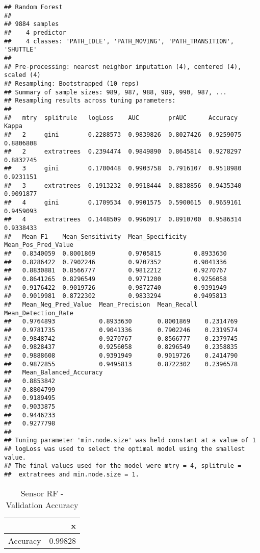 \documentclass[]{article}
\begin{document}
\begin{verbatim}
## Random Forest 
## 
## 9884 samples
##    4 predictor
##    4 classes: 'PATH_IDLE', 'PATH_MOVING', 'PATH_TRANSITION', 'SHUTTLE' 
## 
## Pre-processing: nearest neighbor imputation (4), centered (4), scaled (4) 
## Resampling: Bootstrapped (10 reps) 
## Summary of sample sizes: 989, 987, 988, 989, 990, 987, ... 
## Resampling results across tuning parameters:
## 
##   mtry  splitrule   logLoss    AUC        prAUC      Accuracy   Kappa    
##   2     gini        0.2288573  0.9839826  0.8027426  0.9259075  0.8806808
##   2     extratrees  0.2394474  0.9849890  0.8645814  0.9278297  0.8832745
##   3     gini        0.1700448  0.9903758  0.7916107  0.9518980  0.9231151
##   3     extratrees  0.1913232  0.9918444  0.8838856  0.9435340  0.9091877
##   4     gini        0.1709534  0.9901575  0.5900615  0.9659161  0.9459093
##   4     extratrees  0.1448509  0.9960917  0.8910700  0.9586314  0.9338433
##   Mean_F1    Mean_Sensitivity  Mean_Specificity  Mean_Pos_Pred_Value
##   0.8340059  0.8001869         0.9705815         0.8933630          
##   0.8286422  0.7902246         0.9707352         0.9041336          
##   0.8830881  0.8566777         0.9812212         0.9270767          
##   0.8641265  0.8296549         0.9771200         0.9256058          
##   0.9176422  0.9019726         0.9872740         0.9391949          
##   0.9019981  0.8722302         0.9833294         0.9495813          
##   Mean_Neg_Pred_Value  Mean_Precision  Mean_Recall  Mean_Detection_Rate
##   0.9764893            0.8933630       0.8001869    0.2314769          
##   0.9781735            0.9041336       0.7902246    0.2319574          
##   0.9848742            0.9270767       0.8566777    0.2379745          
##   0.9828437            0.9256058       0.8296549    0.2358835          
##   0.9888608            0.9391949       0.9019726    0.2414790          
##   0.9872855            0.9495813       0.8722302    0.2396578          
##   Mean_Balanced_Accuracy
##   0.8853842             
##   0.8804799             
##   0.9189495             
##   0.9033875             
##   0.9446233             
##   0.9277798             
## 
## Tuning parameter 'min.node.size' was held constant at a value of 1
## logLoss was used to select the optimal model using the smallest value.
## The final values used for the model were mtry = 4, splitrule =
##  extratrees and min.node.size = 1.
\end{verbatim}

\begin{table}[!h]

\caption{\label{tab:sensor-rf-results}Sensor RF - Validation Accuracy}
\centering
\begin{tabular}[t]{lr}
\toprule
  & x\\
\midrule
Accuracy & 0.99828\\
\bottomrule
\end{tabular}
\end{table}
\end{document}
